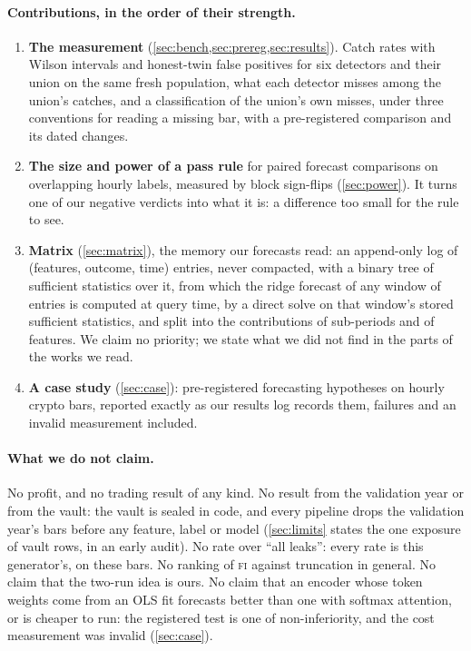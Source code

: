 \documentclass[11pt]{article}
\newcommand{\FI}{\textsc{fi}}
\begin{document}
\paragraph{Contributions, in the order of their strength.}
\begin{enumerate}[leftmargin=*]
\item \textbf{The measurement} (\cref{sec:bench,sec:prereg,sec:results}). Catch rates with Wilson intervals and honest-twin false positives for six detectors and their union on the same fresh population, what each detector misses among the union's catches, and a classification of the union's own misses, under three conventions for reading a missing bar,
  with a pre-registered comparison and its dated changes.
\item \textbf{The size and power of a pass rule} for paired forecast comparisons on overlapping
  hourly labels, measured by block sign-flips (\cref{sec:power}). It turns one of our negative
  verdicts into what it is: a difference too small for the rule to see.
\item \textbf{Matrix} (\cref{sec:matrix}), the memory our forecasts read: an append-only log of
  (features, outcome, time) entries, never compacted, with a binary tree of sufficient statistics
  over it, from which the ridge forecast of any window of entries is computed at query time, by a
  direct solve on that window's stored sufficient statistics, and split into the contributions of
  sub-periods and of features. We claim no priority; we state what
  we did not find in the parts of the works we read.
\item \textbf{A case study} (\cref{sec:case}): pre-registered forecasting hypotheses on hourly
  crypto bars, reported exactly as our results log records them, failures and an invalid
  measurement included.
\end{enumerate}

\paragraph{What we do not claim.} No profit, and no trading result of any kind. No result from the
validation year or from the vault: the vault is sealed in code, and every pipeline drops the validation year's bars before any feature, label or model (\cref{sec:limits} states the one exposure of
vault rows, in an early audit). No rate over ``all leaks'': every rate is this generator's, on
these bars. No ranking of \FI{} against truncation in general. No claim that the two-run idea is
ours. No claim that an encoder whose token weights come from an OLS fit forecasts better than one
with softmax attention, or is cheaper to run: the registered test is one of non-inferiority, and
the cost measurement was invalid (\cref{sec:case}).
\end{document}
